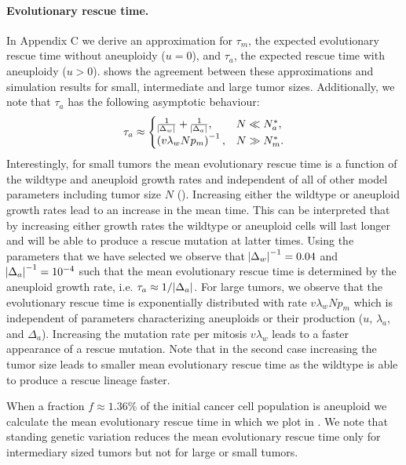 \documentclass[12pt]{extarticle}
\begin{document}
\paragraph{Evolutionary rescue time.}
In Appendix C we derive an approximation for $\tau_m$, the expected evolutionary rescue time without aneuploidy ($u=0$), and $\tau_a$, the expected rescue time with aneuploidy ($u>0$).  shows the agreement between these approximations and simulation results for small, intermediate and large tumor sizes. Additionally, we note that $\tau_a$ has the following asymptotic behaviour:
\begin{equation}  \label{eq:AsymptoticTimeRules}
\tau_a \approx \begin{cases}
    \frac{1}{\abs{\Delta_w}}+\frac{1}{\abs{\Delta_a}} ,&
 N \ll N_a^* ,\\ 
  \left(v\lambda_wNp_m\right)^{-1}  ,&
  N \gg N_m^* .
  \end{cases}
\end{equation}
Interestingly, for small tumors the mean evolutionary rescue time is a function of the wildtype and aneuploid growth rates and independent of all of other model parameters including tumor size $N$ (). Increasing either the wildtype or aneuploid growth rates lead to an increase in the mean time. This can be interpreted that by increasing either growth rates the wildtype or aneuploid cells will last longer and will be able to produce a rescue mutation at latter times. Using the parameters that we have selected we observe that $\abs{\Delta_w}^{-1}=0.04$ and $\abs{\Delta_a}^{-1}=10^{-4}$ such that the mean evolutionary rescue time is determined by the aneuploid growth rate, i.e. $\tau_a\approx1/\abs{\Delta_a}$. For large tumors, we observe that the evolutionary rescue time is exponentially distributed with rate $v\lambda_wNp_m$ which is independent of parameters characterizing aneuploids or their production ($u$, $\lambda_a$, and $\Delta_a$). Increasing the mutation rate per mitosis $v\lambda_w$ leads to a faster appearance of a rescue mutation. Note that in the second case increasing the tumor size leads to smaller mean evolutionary rescue time as the wildtype is able to produce a rescue lineage faster. 

When a fraction $f\approx 1.36\%$ of the initial cancer cell population is aneuploid we calculate the mean evolutionary rescue time in  which we plot in . We note that standing genetic variation reduces the mean evolutionary rescue time only for intermediary sized tumors but not for large or small tumors.
\end{document}
